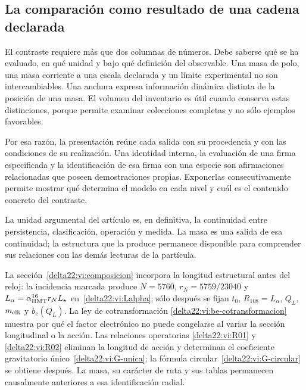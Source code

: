 \subsection{La comparación como resultado de una cadena declarada}

El contraste requiere más que dos columnas de números. Debe saberse qué
se ha evaluado, en qué unidad y bajo qué definición del observable. Una
masa de polo, una masa corriente a una escala declarada y un límite
experimental no son intercambiables. Una anchura expresa información
dinámica distinta de la posición de una masa. El volumen del inventario
es útil cuando conserva estas distinciones, porque permite examinar
colecciones completas y no sólo ejemplos favorables.

Por esa razón, la presentación reúne cada salida con su procedencia y
con las condiciones de su realización. Una identidad interna, la
evaluación de una firma especificada y la identificación de esa firma
con una especie son afirmaciones relacionadas que poseen demostraciones
propias. Exponerlas consecutivamente permite mostrar qué determina el
modelo en cada nivel y cuál es el contenido concreto del contraste.

La unidad argumental del artículo es, en definitiva, la continuidad entre
persistencia, clasificación, operación y medida. La masa es una salida
de esa continuidad; la estructura que la produce permanece disponible
para comprender sus relaciones con las demás lecturas de la partícula.

\par
La sección~\ref{delta22:vi:composicion} incorpora la longitud estructural
antes del reloj: la incidencia marcada produce \(N=5760\),
\(r_N=5759/23040\) y
\(L_\alpha=\alpha_{\rm HMT}^{16}r_NL_\star\)
en~\eqref{delta22:vi:Lalpha}; sólo después se fijan \(t_0\),
\(R_{108}=L_\alpha\), \(Q_L\), \(m_{\rm clk}\) y
\(b_e(Q_L)\). La ley de cotransformación
\eqref{delta22:vi:be-cotransformacion} muestra por qué el factor
electrónico no puede congelarse al variar la sección longitudinal o la
acción. Las relaciones operatorias \eqref{delta22:vi:R01} y
\eqref{delta22:vi:R02} eliminan la longitud de acción y determinan el
coeficiente gravitatorio único~\eqref{delta22:vi:G-unica}; la fórmula
circular~\eqref{delta22:vi:G-circular} se obtiene después. La masa, su
carácter de ruta y sus tablas permanecen causalmente anteriores a esa
identificación radial.
